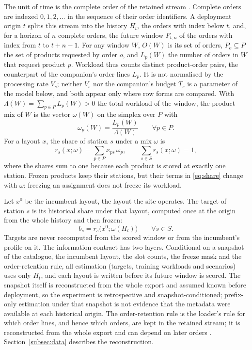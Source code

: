 The unit of time is the complete order of the retained stream . Complete orders are indexed $0,1,2,\dots$ in the sequence of their order identifiers. A deployment origin $t$ splits this stream into the history $H_t$, the orders with index below $t$, and, for a horizon of $n$ complete orders, the future window $F_{t,n}$ of the orders with index from $t$ to $t+n-1$. For any window $W$, $O(W)$ is its set of orders, $P_o\subseteq P$ the set of products requested by order $o$, and $L_p(W)$ the number of orders in $W$ that request product $p$. Workload thus counts distinct product-order pairs, the counterpart of the companion's order lines $L_p$. It is not normalised by the processing rate $V_s$; neither $V_s$ nor the companion's budget $T_s$ is a parameter of the model below, and both appear only where row forms are compared. With $\Lambda(W)=\sum_{p\in P}L_p(W)>0$ the total workload of the window, the product mix of $W$ is the vector $\omega(W)$ on the simplex over $P$ with
\begin{equation}
\omega_p(W)=\frac{L_p(W)}{\Lambda(W)}\qquad\forall p\in P. \label{eq:mix}
\end{equation}
For a layout $x$, the share of station $s$ under a mix $\omega$ is
\begin{equation}
r_s(x;\omega)=\sum_{p\in P}x_{ps}\,\omega_p,\qquad \sum_{s\in S}r_s(x;\omega)=1, \label{eq:share}
\end{equation}
where the shares sum to one because each product is stored at exactly one station. Frozen products keep their stations, but their terms in \eqref{eq:share} change with $\omega$: freezing an assignment does not freeze its workload.

Let $x^0$ be the incumbent layout, the layout the site operates. The target of station $s$ is its historical share under that layout, computed once at the origin from the whole history and then frozen:
\begin{equation}
b_s=r_s\bigl(x^0;\omega(H_t)\bigr)\qquad\forall s\in S. \label{eq:target}
\end{equation}
Targets are never recomputed from the scored window or from the incumbent's profile on it. The information contract has two layers. Conditional on a snapshot of the catalogue, the incumbent layout, the slot counts, the freeze mask and the order-retention rule, all estimation (targets, training workloads and scenarios) uses only $H_t$, and each layout is written before its future window is scored. The snapshot itself is reconstructed from the whole export and assumed known before deployment, so the experiment is retrospective and snapshot-conditioned; prefix-only estimation under that snapshot is not evidence that the metadata were available at each historical origin. The order-retention rule is the loader's rule for which order lines, and hence which orders, are kept in the retained stream; it is reconstructed from the whole export and can depend on later orders . Section~\ref{subsec:data} describes the reconstruction.

